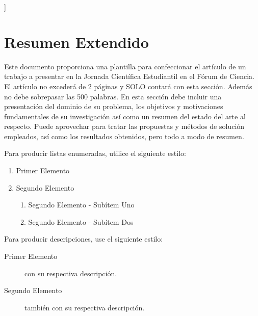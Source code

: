 \documentclass[a4paper,10pt,twocolumn]{article}
\begin{document}
\vspace{0.8cm}
]



\section{Resumen Extendido}\label{sec:intro}
  Este documento proporciona una plantilla para confeccionar el artículo de un 
  trabajo a presentar en la Jornada Científica Estudiantil en el Fórum de Ciencia. El artículo no excederá 
  de 2 páginas y SOLO contará con esta sección. Además no debe sobrepasar las 500 palabras. En esta sección debe incluir una presentación del dominio de su 
  problema, los objetivos y motivaciones fundamentales de su investigación así como 
  un resumen del estado del arte al respecto. Puede aprovechar para tratar las propuestas y métodos de solución empleados, así como los resultados obtenidos, pero todo a modo de resumen.
  
Para producir listas enumeradas, utilice el siguiente estilo:
\begin{enumerate}
	\item Primer Elemento
	\item Segundo Elemento
	\begin {enumerate}
	\item {Segundo Elemento - Subítem Uno}
	\item {Segundo Elemento - Subítem Dos}
	\end {enumerate}
\end{enumerate}

Para producir descripciones, use el siguiente estilo:

\begin{description}
	\item [Primer Elemento] con su respectiva descripción.
	\item [Segundo Elemento] también con su respectiva descripción.
\end{description}
\end{document}
